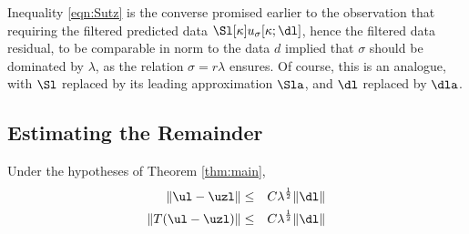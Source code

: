 Inequality \ref{eqn:Sutz} is the converse
promised earlier to the observation that requiring the filtered
predicted data $\Sl[\kappa]u_{\sigma}[\kappa;\dl]$, hence the filtered
data residual, to be comparable in norm to the data $d$ implied that
$\sigma$ should be dominated by $\lambda$, as the relation
$\sigma=r\lambda$ ensures. Of course, this is an analogue, with $\Sl$
replaced by its leading approximation $\Sla$, and $\dl$ replaced by $\dla$. 

\subsection{Estimating the Remainder}

\begin{prop}
  \label{thm:remest}
  Under the hypotheses of Theorem \ref{thm:main},
  \begin{eqnarray}
    \|\ul-\uzl\| &\le& C \lambda^{\frac{1}{2}}\|\dl\|\label{eqn:diffu} \\
    \|T(\ul-\uzl)\| &\le& C \lambda^{\frac{1}{2}}\|\dl\|\label{eqn:difftu}
  \end{eqnarray}
\end{prop}

